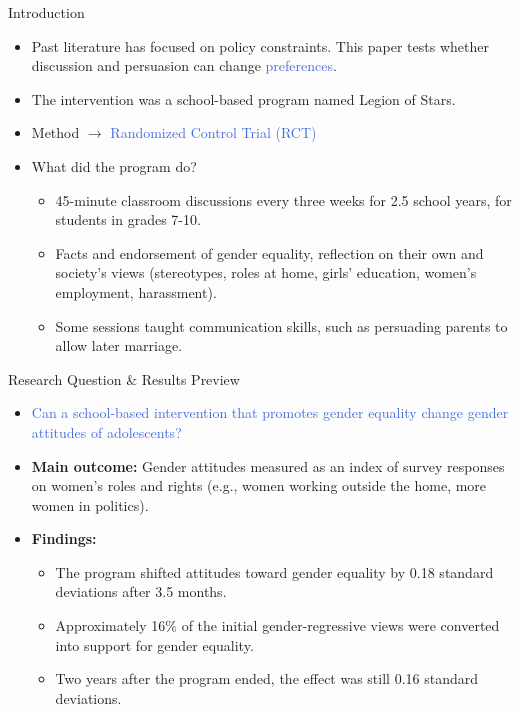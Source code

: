 \documentclass[aspectratio=169,11pt]{beamer}
\begin{document}
\begin{frame}{Introduction}
  \begin{itemize}
    \item Past literature has focused on policy constraints. This paper tests whether discussion and persuasion can change \textcolor{RoyalBlue}{preferences}. 

    \item The intervention was a school-based program named Legion of Stars. 
   \item Method $\rightarrow$ \textcolor{RoyalBlue}{Randomized Control Trial (RCT)} 
      
    \item What did the program do?
   \begin{itemize}
       \item 45-minute classroom discussions every three weeks for 2.5 school years, for students in grades 7-10.
       \item Facts and endorsement of gender equality, reflection on their own and society's views (stereotypes, roles at home, girls' education, women's employment, harassment). 
       \item Some sessions taught communication skills, such as persuading parents to allow later marriage.
       
   \end{itemize}
      
     
     
\end{itemize} 
\end{frame}

\begin{frame}{Research Question \& Results Preview}
  \begin{itemize}
    \item \textcolor{RoyalBlue}{Can a school-based intervention that promotes gender equality change gender attitudes of adolescents?}
    \item \textbf{Main outcome:} Gender attitudes measured as an index of survey responses on women's roles and rights (e.g., women working outside the home, more women in politics).
   
    \item \textbf{Findings:}
    
      \begin{itemize}
        \item The program shifted attitudes toward gender equality by 0.18 standard deviations after 3.5 months. 
        \item Approximately 16\% of the initial gender-regressive views were converted into support for gender equality.
        \item Two years after the program ended, the effect was still 0.16 standard deviations.
       
        
      \end{itemize}
    
  \end{itemize}
\end{frame}
\end{document}
